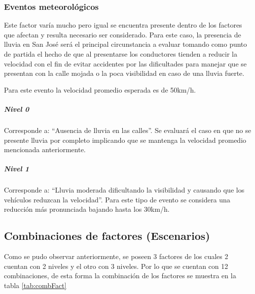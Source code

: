 \subsubsection{Eventos meteorol\'{o}gicos}
Este factor var\'{i}a mucho pero igual se encuentra presente dentro de los factores que afectan y resulta necesario ser considerado. Para este caso, la presencia de lluvia en San Jos\'{e} ser\'{a} el principal circunstancia a evaluar tomando como punto de partida el hecho de que al presentarse los conductores tienden a reducir la velocidad con el fin de evitar accidentes por las dificultades para manejar que se presentan con la calle mojada o la poca visibilidad en caso de una lluvia fuerte.

Para este evento la velocidad promedio esperada es de 50km/h.

\subparagraph{Nivel 0}

Corresponde a: “Ausencia de lluvia en las calles”. Se evaluar\'{a} el caso en que no se presente lluvia por completo implicando que se mantenga la velocidad promedio mencionada anteriormente.

\subparagraph{Nivel 1}

Corresponde a: “Lluvia moderada dificultando la visibilidad y causando que los veh\'{i}culos reduzcan la velocidad”. Para este tipo de evento se considera una reducci\'{o}n m\'{a}s pronunciada bajando hasta los 30km/h.

\subsection{Combinaciones de factores (Escenarios)}
Como se pudo observar anteriormente, se poseen 3 factores de los cuales 2 cuentan con 2 niveles y el otro con 3 niveles. Por lo que se cuentan con 12 combinaciones, de esta forma la combinaci\'{o}n de los factores se muestra en la tabla \ref{tab:combFact} \bigskip


